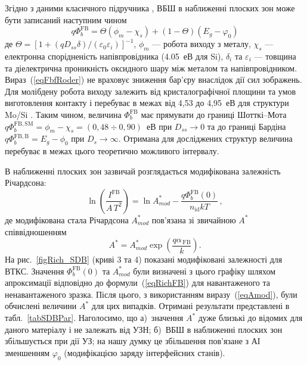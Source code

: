Згідно з даними класичного підручника \cite{Rhoderick1988},
ВБШ в наближенні плоских зон може бути записаний наступним чином
\begin{equation}
\label{eqFbfRoder}
    q\Phi_{b}^\mathrm{FB}=\Theta(\phi_m-\chi_s)+(1-\Theta)(E_g-\varphi_0)
\end{equation}
де $\Theta=[1+(qD_{ss}\delta)/(\varepsilon_0\varepsilon_i)]^{-1}$,
$\phi_m$ --- робота виходу з металу,
$\chi_s$ --- електронна спорідненість напівпровідника (4.05~еВ для Si),
$\delta_i$ та $\varepsilon_i$ --- товщина та діелектрична проникність оксидного шару між металом та напівпровідником.
Вираз~(\ref{eqFbfRoder}) не враховує зниження бар'єру внаслідок дії сил зображень.
Для молібдену робота виходу залежить від кристалографічної площини та умов виготовлення контакту
і перебуває в межах від 4,53 до 4,95~еВ для структури Mo/Si \cite{MoWF2002}.
Таким чином, величина $\Phi_{b}^\mathrm{FB}$ має прямувати до границі Шотткі--Мота
$q\Phi_{b}^\mathrm{FB,SM}=\phi_m-\chi_s=(0,48\div0,90)$~еВ при $D_{ss}\rightarrow0$
та до границі Бардіна $q\Phi_{b}^\mathrm{FB,B}=E_g-\phi_0$ при $D_s\rightarrow\infty$.
Отримана для досліджених структур величина перебуває в межах цього теоретично можливого інтервалу.

В наближенні плоских зон зазвичай розглядається модифікована залежність Річардсона:
\begin{equation}
\label{eqRichFB}
\ln\left(\frac{I^\mathrm{FB}}{A\,T^2}\right)=\ln A^*_{mod}-\frac{q\Phi_{b}^\mathrm{FB}(0)}{n_\mathrm{id}kT}\,,
\end{equation}
де модифікована стала Річардсона $A^*_{mod}$  пов'язана зі звичайною $A^*$  співвідношенням
\begin{equation}
\label{eqAmod}
A^*=A^*_{mod}\exp\left(\frac{q\alpha_\mathrm{\,FB}}{k}\right).
\end{equation}
На рис.~\ref{figRich_SDB} (криві 3 та 4) показані модифіковані залежності для ВТКС.
Значення $\Phi_{b}^\mathrm{FB}(0)$ та $A^*_{mod}$ були визначені з цього графіку шляхом апроксимації відповідно до формули~(\ref{eqRichFB})
для навантаженого та ненавантаженого зразка.
Після цього, з використанням виразу~(\ref{eqAmod}), були обчислені величини $A^*$ для цих випадків.
Отримані результати представлені в табл.~\ref{tabSDBPar}.
Наголосимо, що
а)~значення $A^*$ дуже близькі до відомих для даного матеріалу і не залежать від УЗН;
б)~ВБШ в наближенні плоских зон збільшується при дії УЗ;
на нашу думку це збільшення пов'язане з АІ зменшенням $\varphi_0$ (модифікацією заряду інтерфейсних станів).

